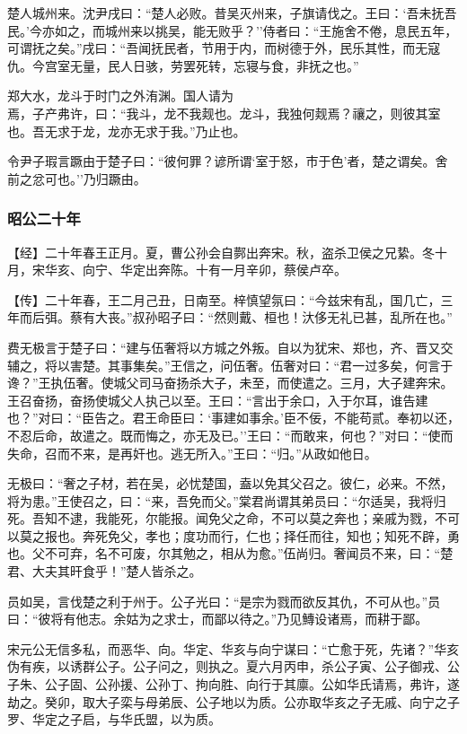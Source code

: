 \documentclass[]{article}
\begin{document}
楚人城州来。沈尹戌曰：``楚人必败。昔吴灭州来，子旗请伐之。王曰：`吾未抚吾民。'今亦如之，而城州来以挑吴，能无败乎？''侍者曰：``王施舍不倦，息民五年，可谓抚之矣。''戌曰：``吾闻抚民者，节用于内，而树德于外，民乐其性，而无寇仇。今宫室无量，民人日骇，劳罢死转，忘寝与食，非抚之也。''

郑大水，龙斗于时门之外洧渊。国人请为\\
焉，子产弗许，曰：``我斗，龙不我觌也。龙斗，我独何觌焉？禳之，则彼其室也。吾无求于龙，龙亦无求于我。''乃止也。

令尹子瑕言蹶由于楚子曰：``彼何罪？谚所谓`室于怒，市于色'者，楚之谓矣。舍前之忿可也。''乃归蹶由。

\hypertarget{header-n2687}{%
\subsubsection{昭公二十年}\label{header-n2687}}

【经】二十年春王正月。夏，曹公孙会自鄸出奔宋。秋，盗杀卫侯之兄絷。冬十月，宋华亥、向宁、华定出奔陈。十有一月辛卯，蔡侯卢卒。

【传】二十年春，王二月己丑，日南至。梓慎望氛曰：``今兹宋有乱，国几亡，三年而后弭。蔡有大丧。''叔孙昭子曰：``然则戴、桓也！汏侈无礼已甚，乱所在也。''

费无极言于楚子曰：``建与伍奢将以方城之外叛。自以为犹宋、郑也，齐、晋又交辅之，将以害楚。其事集矣。''王信之，问伍奢。伍奢对曰：``君一过多矣，何言于谗？''王执伍奢。使城父司马奋扬杀大子，未至，而使遣之。三月，大子建奔宋。王召奋扬，奋扬使城父人执己以至。王曰：``言出于余口，入于尔耳，谁告建也？''对曰：``臣告之。君王命臣曰：`事建如事余。'臣不佞，不能苟贰。奉初以还，不忍后命，故遣之。既而悔之，亦无及已。''王曰：``而敢来，何也？''对曰：``使而失命，召而不来，是再奸也。逃无所入。''王曰：``归。''从政如他日。

无极曰：``奢之子材，若在吴，必忧楚国，盍以免其父召之。彼仁，必来。不然，将为患。''王使召之，曰：``来，吾免而父。''棠君尚谓其弟员曰：``尔适吴，我将归死。吾知不逮，我能死，尔能报。闻免父之命，不可以莫之奔也；亲戚为戮，不可以莫之报也。奔死免父，孝也；度功而行，仁也；择任而往，知也；知死不辟，勇也。父不可弃，名不可废，尔其勉之，相从为愈。''伍尚归。奢闻员不来，曰：``楚君、大夫其旰食乎！''楚人皆杀之。

员如吴，言伐楚之利于州于。公子光曰：``是宗为戮而欲反其仇，不可从也。''员曰：``彼将有他志。余姑为之求士，而鄙以待之。''乃见鱄设诸焉，而耕于鄙。

宋元公无信多私，而恶华、向。华定、华亥与向宁谋曰：``亡愈于死，先诸？''华亥伪有疾，以诱群公子。公子问之，则执之。夏六月丙申，杀公子寅、公子御戎、公子朱、公子固、公孙援、公孙丁、拘向胜、向行于其廪。公如华氏请焉，弗许，遂劫之。癸卯，取大子栾与母弟辰、公子地以为质。公亦取华亥之子无戚、向宁之子罗、华定之子启，与华氏盟，以为质。
\end{document}
